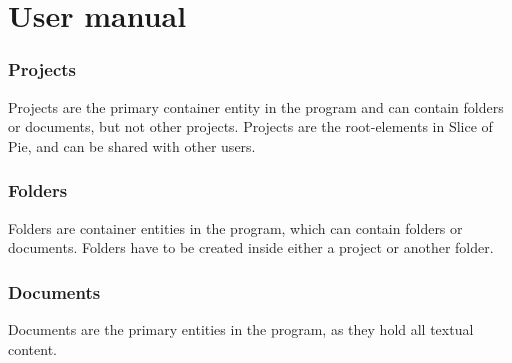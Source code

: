 \section{User manual}
\subsubsection{Projects}
Projects are the primary container entity in the program and can contain folders or documents, but not other projects.
Projects are the root-elements in Slice of Pie, and can be shared with other users.

\subsubsection{Folders}
Folders are container entities in the program, which can contain folders or documents. Folders have to be created inside either a project or another folder.

\subsubsection{Documents}
Documents are the primary entities in the program, as they hold all textual content.




